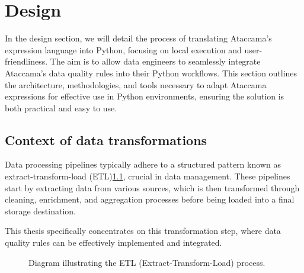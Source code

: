 
\chapter{Design}

In the design section, we will detail the process of translating Ataccama's expression language into Python, focusing on local execution and user-friendliness. The aim is to allow data engineers to seamlessly integrate Ataccama's data quality rules into their Python workflows. This section outlines the architecture, methodologies, and tools necessary to adapt Ataccama expressions for effective use in Python environments, ensuring the solution is both practical and easy to use.

\section{Context of data transformations}

Data processing pipelines typically adhere to a structured pattern known as extract-transform-load (ETL)\cite{etl}\ref{fig:etl_process}, crucial in data management. These pipelines start by extracting data from various sources, which is then transformed through cleaning, enrichment, and aggregation processes before being loaded into a final storage destination.

This thesis specifically concentrates on this transformation step, where data quality rules can be effectively implemented and integrated.

\begin{figure}[ht]
    \centering
    \caption{Diagram illustrating the ETL (Extract-Transform-Load) process.}
    \label{fig:etl_process}
    \end{figure}

